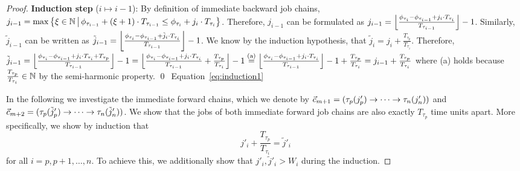 \documentclass[10pt,conference]{resources/IEEEtran}
\theoremstyle{definition}
\theoremstyle{remark}
\newcommand{\fc}{\fw{c}}
\theoremstyle{definition}
\begin{document}
\begin{proof}
		\textbf{Induction step} ($i \mapsto i-1$):
		By definition of immediate backward job chains, 
		$j_{i-1} = \max \left\{\xi \in \mathbb{N} \,\middle|\,  \phi_{\tau_{i-1}} + (\xi+1) \cdot T_{\tau_{i-1}} \leq \phi_{\tau_i} + j_i \cdot T_{\tau_{i}}\right\}$.
		Therefore, $j_{i-1}$ can be formulated as 
		$j_{i-1} = \left\lfloor{\frac{\phi_{\tau_i} - \phi_{\tau_{i-1}} + j_i \cdot T_{\tau_i}}{T_{\tau_{i-1}}}}\right\rfloor -1$.
		Similarly, $\tilde{j}_{i-1}$ can be written as 
		$\tilde{j}_{i-1} = \left\lfloor{\frac{\phi_{\tau_i} - \phi_{\tau_{i-1}} + \tilde{j}_i \cdot T_{\tau_i}}{T_{\tau_{i-1}}}}\right\rfloor -1$.
		We know by the induction hypothesis, that $\tilde{j}_i = j_i + \frac{T_{\tau_p}}{T_{\tau_i}}$.
		Therefore, 
		\begin{math}
			\tilde{j}_{i-1} 
			= \left\lfloor{\frac{\phi_{\tau_i} - \phi_{\tau_{i-1}} + j_i \cdot T_{\tau_i} + T_{\tau_p}}{T_{\tau_{i-1}}}}\right\rfloor -1
			= \left\lfloor{\frac{\phi_{\tau_i} - \phi_{\tau_{i-1}} + j_i \cdot T_{\tau_i}}{T_{\tau_{i-1}}} + \frac{T_{\tau_p}}{T_{\tau_i}}}\right\rfloor -1
			\overset{\text{(a)}}{=} \left\lfloor{\frac{\phi_{\tau_i} - \phi_{\tau_{i-1}} + j_i \cdot T_{\tau_i}}{T_{\tau_{i-1}}}}\right\rfloor -1 + \frac{T_{\tau_p}}{T_{\tau_i}}
			= j_{i-1} + \frac{T_{\tau_p}}{T_{\tau_i}}
		\end{math}
		where (a) holds because $\frac{T_{\tau_p}}{T_{\tau_i}} \in \mathbb{N}$ by the semi-harmonic property. \qed~Equation~\eqref{eq:induction1}

		In the following we investigate the immediate forward chains, which we denote by
		$\fc_{m+1} = (\tau_p(j'_p) \to\dots\to \tau_n(j'_n))$ and $\fc_{m+2} = (\tau_p(\tilde{j}'_p) \to\dots\to \tau_n({\tilde{j}'}_n))$.
		We show that the jobs of both immediate forward job chains are also exactly $T_{\tau_p}$ time units apart.
		More specifically, we show by induction that 
		\begin{equation}\label{eq:induction2}
			j'_i + \frac{T_{\tau_p}}{T_{\tau_i}} = \tilde{j}'_i
		\end{equation}
		for all $i=p, p{+}1, \dots, n$.
		To achieve this, we additionally show that $j'_i, \tilde{j}'_i > W_i$ during the induction.


\end{proof}
\end{document}
